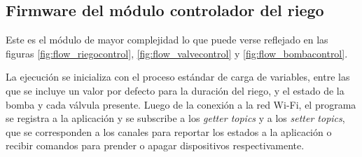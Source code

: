 \pagebreak
\subsection{Firmware del módulo controlador del riego}
\label{Firmware del módulo controlador del riego}

Este es el módulo de mayor complejidad lo que puede verse reflejado en las figuras \ref{fig:flow_riegocontrol}, \ref{fig:flow_valvecontrol}  y \ref{fig:flow_bombacontrol}.

La ejecución se inicializa con el proceso estándar de carga de variables, entre las que se incluye un valor por defecto para la duración del riego, y el estado de la bomba y cada válvula presente. Luego de la conexión a la red Wi-Fi, el programa se registra a la aplicación y se subscribe a los \textit{getter topics} y a los  \textit{setter topics}, que se corresponden a los canales para reportar los estados a la aplicación o recibir comandos para prender o apagar dispositivos respectivamente.


